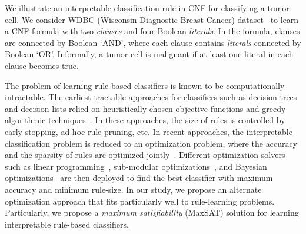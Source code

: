 \begin{example}
	We illustrate an interpretable classification rule in CNF for classifying a tumor cell. We consider WDBC (Wisconsin Diagnostic Breast Cancer) dataset~\cite{agarap2018breast} to learn a CNF formula with two \emph{clauses} and four Boolean \emph{literals}. In the formula, clauses are connected by Boolean `AND', where each clause contains \emph{literals} connected by Boolean `OR'. Informally, a tumor cell is malignant if at least one literal in each clause becomes true.
\end{example}



The problem of learning rule-based classifiers is known to be computationally intractable. The earliest tractable approaches for classifiers such as decision trees and decision lists relied on heuristically chosen objective functions and greedy algorithmic techniques~\cite{ClarkN1989,CohenS1999,quinlan2014}. In these approaches, the size of rules is controlled by early stopping,  ad-hoc rule pruning, etc. In recent approaches, the interpretable classification problem is reduced to an optimization problem, where the accuracy and the sparsity of rules are optimized jointly~\cite{lakkaraju2016interpretable,narodytska2018learning}. Different optimization solvers such as linear programming~\cite{malioutov2013exact}, sub-modular optimizations~\cite{lakkaraju2016interpretable}, and Bayesian optimizations~\cite{letham2015interpretable} are then deployed to find the best classifier with maximum accuracy and minimum rule-size. In our study, we propose an alternate optimization approach that fits particularly well to rule-learning problems. Particularly,  we propose a \textit{maximum satisfiability} (MaxSAT)  solution for learning interpretable rule-based classifiers. 





